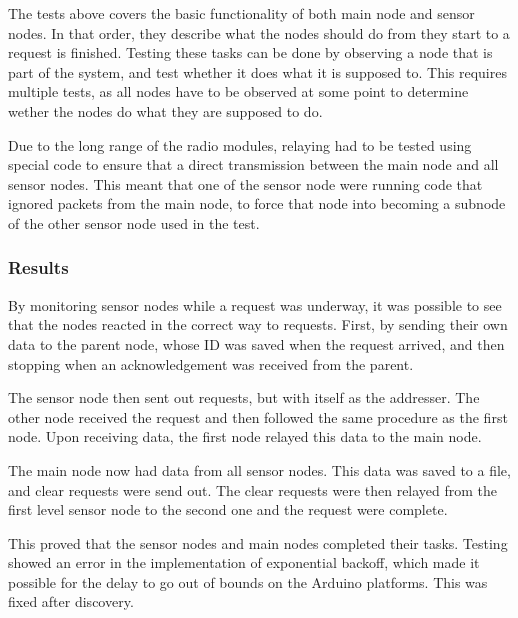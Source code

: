 The tests above covers the basic functionality of both main node and sensor nodes. In that order, they describe what the nodes should do from they start to a request is finished.
Testing these tasks can be done by observing a node that is part of the system, and test whether it does what it is supposed to. This requires multiple tests, as all nodes have to be observed at some point to determine wether the nodes do what they are supposed to do.

Due to the long range of the radio modules, relaying had to be tested using special code to ensure that a direct transmission between the main node and all sensor nodes. This meant that one of the sensor node were running code that ignored packets from the main node, to force that node into becoming a subnode of the other sensor node used in the test.

\subsubsection*{Results}
By monitoring sensor nodes while a request was underway, it was possible to see that the nodes reacted in the correct way to requests. First, by sending their own data to the parent node, whose ID was saved when the request arrived, and then stopping when an acknowledgement was received from the parent.

The sensor node then sent out requests, but with itself as the addresser. The other node received the request and then followed the same procedure as the first node. Upon receiving data, the first node relayed this data to the main node.

The main node now had data from all sensor nodes. This data was saved to a file, and clear requests were send out. The clear requests were then relayed from the first level sensor node to the second one and the request were complete.

This proved that the sensor nodes and main nodes completed their tasks. Testing showed an error in the implementation of exponential backoff, which made it possible for the delay to go out of bounds on the Arduino platforms. This was fixed after discovery.
